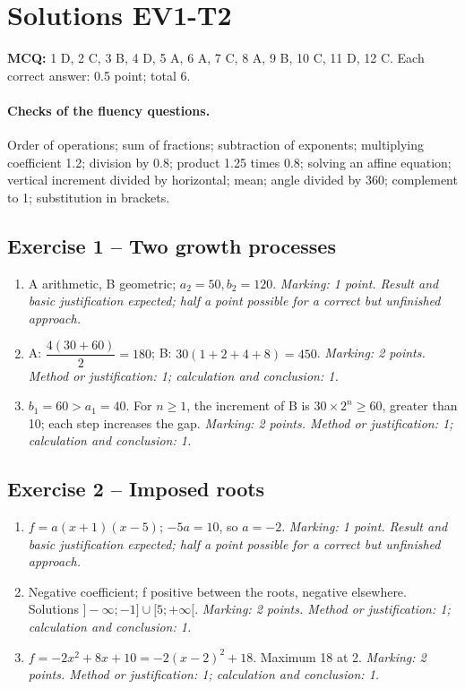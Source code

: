 \mxnewpage\section*{Solutions EV1-T2}\label{EV1-T2-CORR}
\textbf{MCQ:} 1 D, 2 C, 3 B, 4 D, 5 A, 6 A, 7 C, 8 A, 9 B, 10 C, 11 D, 12 C. Each correct answer: 0.5 point; total 6.
\paragraph{Checks of the fluency questions.} Order of operations; sum of fractions; subtraction of exponents; multiplying coefficient 1.2; division by 0.8; product 1.25 times 0.8; solving an affine equation; vertical increment divided by horizontal; mean; angle divided by 360; complement to 1; substitution in brackets.
\subsection*{Exercise 1 -- Two growth processes}
\begin{enumerate}
\item A arithmetic, B geometric; $a_2=50,b_2=120$. \textit{Marking: 1 point. Result and basic justification expected; half a point possible for a correct but unfinished approach.}
\item A: $\dfrac{4(30+60)}{2}=180$; B: $30(1+2+4+8)=450$. \textit{Marking: 2 points. Method or justification: 1; calculation and conclusion: 1.}
\item $b_1=60>a_1=40$. For $n\geq1$, the increment of B is $30\times2^n\geq60$, greater than 10; each step increases the gap. \textit{Marking: 2 points. Method or justification: 1; calculation and conclusion: 1.}
\end{enumerate}
\subsection*{Exercise 2 -- Imposed roots}
\begin{enumerate}
\item $f=a(x+1)(x-5)$; $-5a=10$, so $a=-2$. \textit{Marking: 1 point. Result and basic justification expected; half a point possible for a correct but unfinished approach.}
\item Negative coefficient; f positive between the roots, negative elsewhere. Solutions $]-\infty;-1]\cup[5;+\infty[$. \textit{Marking: 2 points. Method or justification: 1; calculation and conclusion: 1.}
\item $f=-2x^2+8x+10=-2(x-2)^2+18$. Maximum 18 at 2. \textit{Marking: 2 points. Method or justification: 1; calculation and conclusion: 1.}
\end{enumerate}
